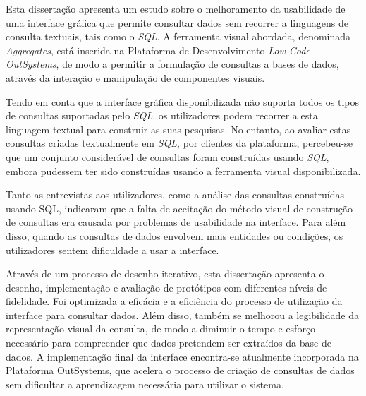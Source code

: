 Esta dissertação apresenta um estudo sobre o melhoramento da usabilidade de uma interface gráfica que permite consultar dados sem recorrer a linguagens de consulta textuais, tais como o \textit{SQL}. A ferramenta visual abordada, denominada \textit{Aggregates}, está inserida na Plataforma de Desenvolvimento \textit{Low-Code} \textit{OutSystems}, de modo a permitir a formulação de consultas a bases de dados, através da interação e manipulação de componentes visuais.

Tendo em conta que a interface gráfica disponibilizada não suporta todos os tipos de consultas suportadas pelo \textit{SQL}, os utilizadores podem recorrer a esta linguagem textual para construir as suas pesquisas. No entanto, ao avaliar estas consultas criadas textualmente em \textit{SQL}, por clientes da plataforma, percebeu-se que um conjunto considerável de consultas foram construídas usando \textit{SQL}, embora pudessem ter sido construídas usando a ferramenta visual disponibilizada.

Tanto as entrevistas aos utilizadores, como a análise das consultas construídas usando SQL, indicaram que a falta de aceitação do método visual de construção de consultas era causada por problemas de usabilidade na interface. Para além disso, quando as consultas de dados envolvem mais entidades ou condições, os utilizadores sentem dificuldade a usar a interface.

Através de um processo de desenho iterativo, esta dissertação apresenta o desenho, implementação e avaliação de protótipos com diferentes níveis de fidelidade. Foi optimizada a eficácia e a eficiência do processo de utilização da interface para consultar dados. Além disso, também se melhorou a legibilidade da representação visual da consulta, de modo a diminuir o tempo e esforço necessário para compreender que dados pretendem ser extraídos da base de dados. A implementação final da interface encontra-se atualmente incorporada na Plataforma OutSystems, que acelera o processo de criação de consultas de dados sem dificultar a aprendizagem necessária para utilizar o sistema.


